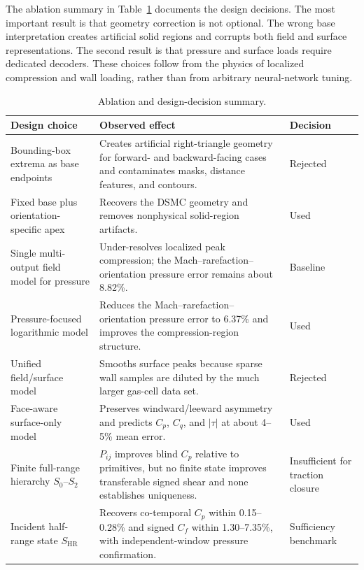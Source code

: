 \documentclass[aip,pof,preprint,notitlepage,floatfix,amsmath,amssymb]{revtex4-2}
\begin{document}
The ablation summary in Table~\ref{tab:ablation} documents the design decisions. The most important result is that geometry correction is not optional. The wrong base interpretation creates artificial solid regions and corrupts both field and surface representations. The second result is that pressure and surface loads require dedicated decoders. These choices follow from the physics of localized compression and wall loading, rather than from arbitrary neural-network tuning.


\begin{table}[t]
\centering
\caption{Ablation and design-decision summary.}
\label{tab:ablation}
\footnotesize
\begin{tabular}{p{} p{} p{}}
\toprule
Design choice & Observed effect & Decision \\
\midrule
Bounding-box extrema as base endpoints & Creates artificial right-triangle geometry for forward- and backward-facing cases and contaminates masks, distance features, and contours. & Rejected \\
Fixed base plus orientation-specific apex & Recovers the DSMC geometry and removes nonphysical solid-region artifacts. & Used \\
Single multi-output field model for pressure & Under-resolves localized peak compression; the Mach--rarefaction--orientation pressure error remains about 8.82\%. & Baseline \\
Pressure-focused logarithmic model & Reduces the Mach--rarefaction--orientation pressure error to 6.37\% and improves the compression-region structure. & Used \\
Unified field/surface model & Smooths surface peaks because sparse wall samples are diluted by the much larger gas-cell data set. & Rejected \\
Face-aware surface-only model & Preserves windward/leeward asymmetry and predicts $C_p$, $C_q$, and $|\tau|$ at about 4--5\% mean error. & Used \\
Finite full-range hierarchy $S_0$--$S_2$ & $P_{ij}$ improves blind $C_p$ relative to primitives, but no finite state improves transferable signed shear and none establishes uniqueness. & Insufficient for traction closure \\
Incident half-range state $S_{\mathrm{HR}}$ & Recovers co-temporal $C_p$ within 0.15--0.28\% and signed $C_f$ within 1.30--7.35\%, with independent-window pressure confirmation. & Sufficiency benchmark \\
\bottomrule
\end{tabular}
\end{table}
\end{document}
